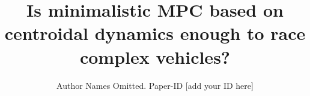 \documentclass[conference]{IEEEtran} %
\begin{document}
\title{Is minimalistic MPC based on centroidal dynamics enough to race complex vehicles?}

\author{Author Names Omitted. Paper-ID [add your ID here]}





%


\maketitle
\end{document}
